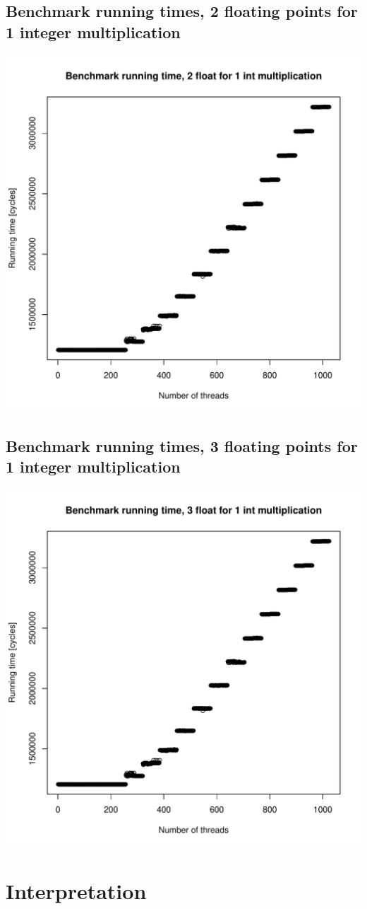 \documentclass{article}
\begin{document}
	\subsection{Benchmark running times, 2 floating points for 1 integer multiplication}
	\includegraphics[width=\linewidth]{"graphics/running_times_ratio21"}
	\pagebreak

	\subsection{Benchmark running times, 3 floating points for 1 integer multiplication}
	\includegraphics[width=\linewidth]{"graphics/running_times_ratio31"}
	\pagebreak

\section{Interpretation}
\end{document}
